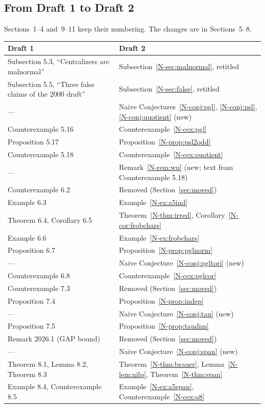 \documentclass[12pt,letterpaper]{article}
\begin{document}
\subsection{From Draft 1 to Draft 2}

Sections~1--4 and~9--11 keep their numbering. The changes are in
Sections~5--8.

\begin{center}
\renewcommand{\arraystretch}{1.12}
\begin{tabular}{>{\raggedright}p{6.2cm}>{\raggedright\arraybackslash}p{8cm}}
\toprule
Draft 1 & Draft 2\\
\midrule
Subsection 5.3, ``Centralizers are malnormal'' & Subsection~\ref{N-sec:malnormal},
retitled\\
Subsection 5.5, ``Three false claims of the 2000 draft'' & Subsection~\ref{N-sec:false}, retitled\\
--- & Naive Conjectures~\ref{N-conj:pgl}, \ref{N-conj:psl},
\ref{N-conj:quotient} (new)\\
Counterexample 5.16 & Counterexample~\ref{N-cex:pgl}\\
Proposition 5.17 & Proposition~\ref{N-prop:psl2odd}\\
Counterexample 5.18 & Counterexample~\ref{N-cex:quotient}\\
--- & Remark~\ref{N-rem:wu} (new; text from Counterexample 5.18)\\
Counterexample 6.2 & Removed (Section~\ref{sec:moved})\\
Example 6.3 & Example~\ref{N-ex:a5ind}\\
Theorem 6.4, Corollary 6.5 & Theorem~\ref{N-thm:irred},
Corollary~\ref{N-cor:frobchars}\\
Example 6.6 & Example~\ref{N-ex:frobchars}\\
Proposition 6.7 & Proposition~\ref{N-prop:pglnorm}\\
--- & Naive Conjecture~\ref{N-conj:pgltori} (new)\\
Counterexample 6.8 & Counterexample~\ref{N-cex:pglcor}\\
Counterexample 7.3 & Removed (Section~\ref{sec:moved})\\
Proposition 7.4 & Proposition~\ref{N-prop:indep}\\
--- & Naive Conjecture~\ref{N-conj:tau} (new)\\
Proposition 7.5 & Proposition~\ref{N-prop:taudim}\\
Remark 2026.1 (GAP bound) & Removed (Section~\ref{sec:moved})\\
--- & Naive Conjecture~\ref{N-conj:span} (new)\\
Theorem 8.1, Lemma 8.2, Theorem 8.3 & Theorem~\ref{N-thm:brauer},
Lemma~\ref{N-lem:nilp}, Theorem~\ref{N-thm:span}\\
Example 8.4, Counterexample 8.5 & Example~\ref{N-ex:a5span},
Counterexample~\ref{N-cex:q8}\\
\bottomrule
\end{tabular}
\end{center}
\end{document}
